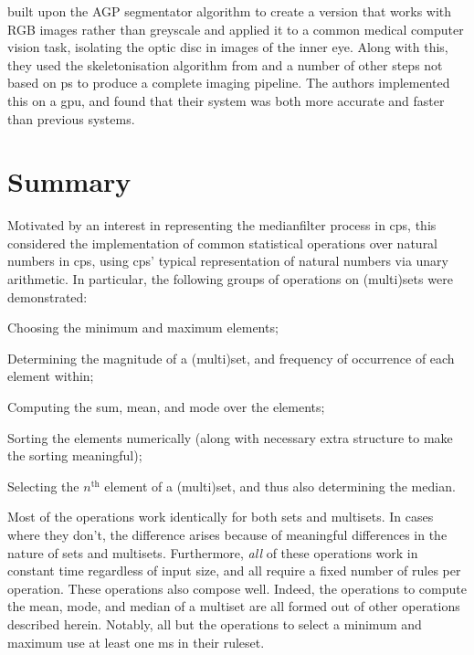 \citeauthor{Diaz-Pernil2016} \cite{Diaz-Pernil2016} built upon the AGP segmentator algorithm to create a version that works with RGB images rather than greyscale and applied it to a common medical computer vision task, isolating the optic disc in images of the inner eye.  Along with this, they used the skeletonisation algorithm from \cite{Diaz-Pernil2013a} and a number of other steps not based on \gls{ps} to produce a complete imaging pipeline.  The authors implemented this on a \gls{gpu}, and found that their system was both more accurate and faster than previous systems.





\section{Summary}

Motivated by an interest in representing the \gls{medianfilter} process in \gls{cps}, this  considered the implementation of common statistical operations over natural numbers in \gls{cps}, using \gls{cps}' typical representation of natural numbers via unary arithmetic.  In particular, the following groups of operations on (multi)sets were demonstrated:
\begin{inparaenum}[(i)]
\item Choosing the minimum and maximum elements;
\item Determining the magnitude of a (multi)set, and frequency of occurrence of each element within;
\item Computing the sum, mean, and mode over the elements;
\item Sorting the elements numerically (along with necessary extra structure to make the sorting meaningful);
\item Selecting the \(n^\text{th}\) element of a (multi)set, and thus also determining the median.
\end{inparaenum}

Most of the operations work identically for both sets and multisets.  In cases where they don't, the difference arises because of meaningful differences in the nature of sets and multisets.  Furthermore, \emph{all} of these operations work in constant time regardless of input size, and all require a fixed number of rules per operation.  These operations also compose well.  Indeed, the operations to compute the mean, mode, and median of a multiset are all formed out of other operations described herein.  Notably, all but the operations to select a minimum and maximum use at least one \gls{ms} in their ruleset.

